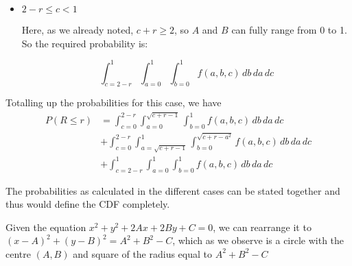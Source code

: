 \documentclass[12pt, oneside]{article}
\begin{document}
\begin{enumerate}
{\begin{enumerate}
{\begin{itemize}
{\begin{itemize}
{                            Here, \(c + r - a^2 \leq 1\), so \(B\) will range from 0 to
                            \(\sqrt{c + r - a^2}\). So the required probability is:
                            \[
                                \int_{c = 0}^{2 - r} \int_{a=\sqrt{c + r - 1}}^{1} 
                                \int_{b = 0}^{\sqrt{c + r - a^2}} f(a, b, c)\, db\, da\, dc
                            \]
                        }
                    \end{itemize}
                }
                \item {
                    \(2 - r \leq c < 1\)

                    Here, as we already noted, \(c + r \geq 2\), so \(A\) and \(B\) can fully
                    range from 0 to 1. So the required probability is:

                    \[
                        \int_{c = 2 - r}^{1} \int_{a=0}^{1} 
                        \int_{b = 0}^{1} f(a, b, c)\, db\, da\, dc
                    \]
                }
            \end{itemize}

            Totalling up the probabilities for this case, we have
            \begin{align*}
                P(R \leq r) &= \int_{c = 0}^{2 - r} \int_{a=0}^{\sqrt{c + r - 1}} 
                                \int_{b = 0}^{1} f(a, b, c)\, db\, da\, dc \\
                            &+ \int_{c = 0}^{2 - r} \int_{a=\sqrt{c + r - 1}}^{1} 
                                \int_{b = 0}^{\sqrt{c + r - a^2}} f(a, b, c)\, db\, da\, dc \\
                            &+ \int_{c = 2 - r}^{1} \int_{a=0}^{1} 
                                \int_{b = 0}^{1} f(a, b, c)\, db\, da\, dc
            \end{align*}
        }
    \end{enumerate}

    The probabilities as calculated in the different cases can be stated together and
    thus would define the CDF completely.

    Given the equation \(x^2 + y^2 + 2Ax + 2By + C = 0\), we can rearrange it to
    \((x - A)^2 + (y - B)^2 = A^2 + B^2 - C\), which as we observe is a circle with the
    centre \((A, B)\) and square of the radius equal to \(A^2 + B^2 - C\)

}
\end{enumerate}
\end{document}
